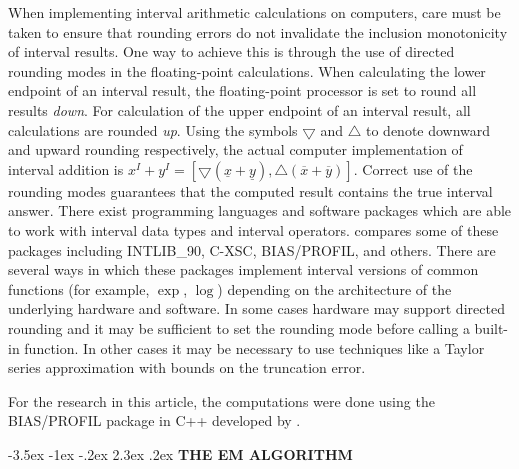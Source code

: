 \documentclass[10pt,twoside]{article}
\makeatletter
\renewcommand\section{\@startsection {section}{1}{\z@}%
                 {-3.5ex \@plus -1ex \@minus -.2ex}%
                 {2.3ex \@plus.2ex}%
                 {\normalfont\centering\bfseries }}
\makeatother
\begin{document}
When implementing interval arithmetic calculations on computers, care must
be taken to ensure that rounding errors do not invalidate the 
inclusion monotonicity
of interval results.  One way to achieve this is through the
use of directed rounding modes in the floating-point calculations.  When 
calculating the lower endpoint of an interval result, the floating-point
processor is set to round all results {\it down}. For calculation of the
upper endpoint of an interval result, all calculations are rounded
{\it up}.  Using the symbols $\bigtriangledown$ and $\bigtriangleup$ to
denote 
downward and upward rounding 
respectively, the actual computer implementation of interval addition is
$x^I + y^I = [\bigtriangledown (\underline{x}+\underline{y}),
              \bigtriangleup(\overline{x} + \overline{y})] $.
Correct use of the rounding modes guarantees that the computed
result contains the true interval answer.  
There exist programming languages and software packages 
which are able to work with
interval data types and interval operators. 
\cite{KearfottBook} compares some of these packages including
INTLIB\_90, C-XSC, BIAS/PROFIL, and others.  There are several ways in which
these packages implement interval versions of 
common functions (for example, $\exp$, $\log$)
depending on the architecture of the underlying hardware and
software.  In some cases hardware may support directed rounding and
it may be sufficient to set the rounding mode before calling a
built-in function.  In other cases it may be necessary to use
techniques like a Taylor series approximation with bounds on the
truncation error.

For the research in this article, the
computations were done using the 
BIAS/PROFIL package in C++ developed by \cite{Knu93b}.

\section{\bf THE EM ALGORITHM}\label{sec:em}
\end{document}
